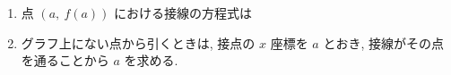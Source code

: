 \documentclass[14pt,dvipdfmx]{jsarticle}
\begin{document}
\vspace{-0.9em}
\begin{summarybox}
  \begin{enumerate}[label=\textbf{\arabic*}, leftmargin=1.5zw, itemsep=0.28em, topsep=0.12em]
    \item 点 $(a,\ f(a))$ における接線の方程式は
          \par\vspace{0.12em}
          {\renewcommand{\fitblankpad}{1.2zw}%
          \hspace*{1zw}}
          \par\vspace{0.2em}
    \item グラフ上にない点から引くときは, 接点の $x$ 座標を $a$ とおき,
          接線がその点を通ることから $a$ を求める.
  \end{enumerate}
\end{summarybox}

\vspace{0.05em}
\end{document}
